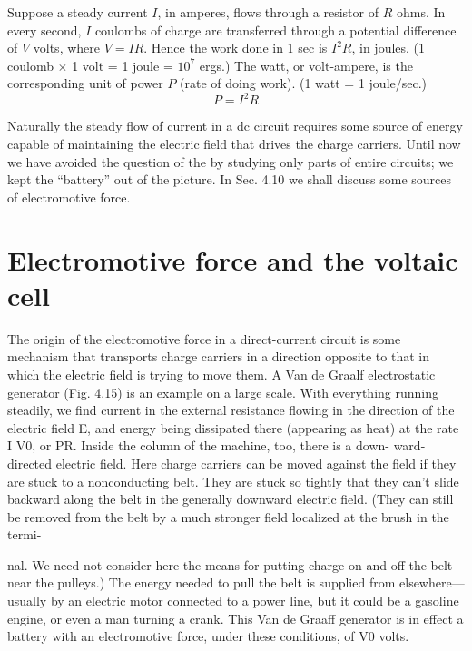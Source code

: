 Suppose a steady current $I$, in amperes, flows through a resistor
of $R$ ohms. In every second, $I$ coulombs of charge are transferred
through a potential difference of $V$ volts, where $V = IR$. Hence the
work done in 1 sec is $I^2R$, in joules. (1 coulomb $\times$ 1 volt = 1 joule =
$10^7$ ergs.) The watt, or volt-ampere, is the corresponding unit of
power $P$ (rate of doing work). (1 watt = 1 joule/sec.)
\begin{equation}
  P = I^2 R
\end{equation}

Naturally the steady flow of current in a dc circuit requires some
source of energy capable of maintaining the electric field that drives
the charge carriers. Until now we have avoided the question of the
 by studying only parts of entire circuits; we kept
the ``battery'' out of the picture. In Sec. 4.10 we shall discuss some
sources of electromotive force.

\iffalse

\section{Electromotive force and the voltaic cell}

The origin of the electromotive force in a direct-current circuit is
some mechanism that transports charge carriers in a direction opposite
to that in which the electric field is trying to move them.
A Van de Graalf electrostatic generator (Fig. 4.15) is an example on
a large scale. With everything running steadily, we find current in
the external resistance flowing in the direction of the electric field E,
and energy being dissipated there (appearing as heat) at the rate
I V0, or PR. Inside the column of the machine, too, there is a down-
ward-directed electric field. Here charge carriers can be moved
against the field if they are stuck to a nonconducting belt. They are
stuck so tightly that they can't slide backward along the belt in the
generally downward electric field. (They can still be removed from
the belt by a much stronger field localized at the brush in the termi-

nal. We need not consider here the means for putting charge on and
off the belt near the pulleys.) The energy needed to pull the belt is
supplied from elsewhere---usually by an electric motor connected to
a power line, but it could be a gasoline engine, or even a man turning
a crank. This Van de Graaff generator is in effect a battery with an
electromotive force, under these conditions, of V0 volts.

